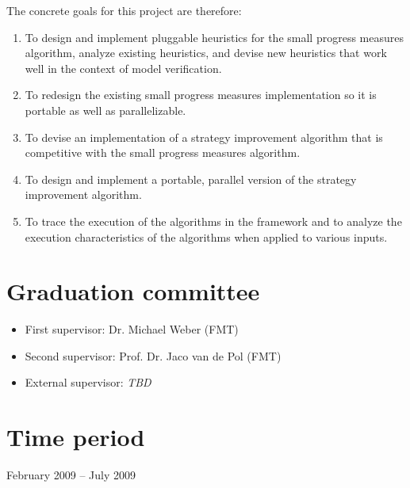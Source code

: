 \documentclass[11pt]{article}
\begin{document}
The concrete goals for this project are therefore:
\begin{enumerate}
\item To design and implement pluggable heuristics for the small progress measures
      algorithm, analyze existing heuristics, and devise new heuristics that
      work well in the context of model verification.
\item To redesign the existing small progress measures implementation so it is
      portable as well as parallelizable.
\item To devise an implementation of a strategy improvement algorithm that is
      competitive with the small progress measures algorithm.
\item To design and implement a portable, parallel version of the strategy
      improvement algorithm.
\item To trace the execution of the algorithms in the framework and to analyze
      the execution characteristics of the algorithms when applied to various
      inputs.
\end{enumerate}

\section{Graduation committee}
\begin{itemize}
\item First supervisor: Dr. Michael Weber (FMT)
\item Second supervisor: Prof. Dr. Jaco van de Pol (FMT)
\item External supervisor: \emph{TBD}
\end{itemize}

\section{Time period}
February 2009 -- July 2009



\end{document}
